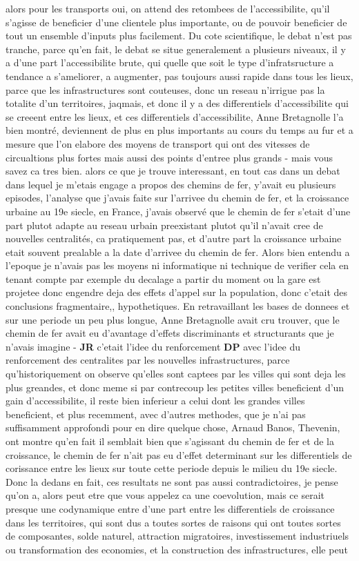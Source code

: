 \documentclass[12pt]{article}
\begin{document}
alors pour les transports oui, on attend des retombees de l'accessibilite, qu'il s'agisse de beneficier d'une clientele plus importante, ou de pouvoir beneficier de tout un ensemble d'inputs plus facilement. Du cote scientifique, le debat n'est pas tranche, parce qu'en fait, le debat se situe generalement a plusieurs niveaux, il y a d'une part l'accessibilite brute, qui quelle que soit le type d'infratsructure a tendance a s'ameliorer, a augmenter, pas toujours aussi rapide dans tous les lieux, parce que les infrastructures sont couteuses, donc un reseau n'irrigue pas la totalite d'un territoires, jaqmais, et donc il y a des differentiels d'accessibilite qui se creeent entre les lieux, et ces differentiels d'accessibilite, Anne Bretagnolle l'a bien montré, deviennent de plus en plus importants au cours du temps au fur et a mesure que l'on elabore des moyens de transport qui ont des vitesses de circualtions plus fortes mais aussi des points d'entree plus grands - mais vous savez ca tres bien. alors ce que je trouve interessant, en tout cas dans un debat dans lequel je m'etais engage a propos des chemins de fer, y'avait eu plusieurs episodes, l'analyse que j'avais faite sur l'arrivee du chemin de fer, et la croissance urbaine au 19e siecle, en France, j'avais observé que le chemin de fer s'etait d'une part plutot adapte au reseau urbain preexistant plutot qu'il n'avait cree de nouvelles centralités, ca pratiquement pas, et d'autre part la croissance urbaine etait souvent prealable a la date d'arrivee du chemin de fer. Alors bien entendu a l'epoque je n'avais pas les moyens ni informatique ni technique de verifier cela en tenant compte par exemple du decalage a partir du moment ou la gare est projetee donc engendre deja des effets d'appel sur la population, donc c'etait des conclusions fragmentaire,, hypothetiques. En retravaillant les bases de donnees et sur une periode un peu plus longue, Anne Bretagnolle avait cru trouver, que le chemin de fer avait eu d'avantage d'effets discriminants et structurants que je n'avais imagine - \textbf{JR} c'etait l'idee du renforcement \textbf{DP} avec l'idee du renforcement des centralites par les nouvelles infrastructures, parce qu'historiquement on observe qu'elles sont captees par les villes qui sont deja les plus greandes, et donc meme si par contrecoup les petites villes beneficient d'un gain d'accessibilite, il reste bien inferieur a celui dont les grandes villes beneficient, et plus recemment, avec d'autres methodes, que je n'ai pas suffisamment approfondi pour en dire quelque chose, Arnaud Banos, Thevenin, ont montre qu'en fait il semblait bien que s'agissant du chemin de fer et de la croissance, le chemin de fer n'ait pas eu d'effet determinant sur les differentiels de corissance entre les lieux sur toute cette periode depuis le milieu du 19e siecle. Donc la dedans en fait, ces resultats ne sont pas aussi contradictoires, je pense qu'on a, alors peut etre que vous appelez ca une coevolution, mais ce serait presque une codynamique entre d'une part entre les differentiels de croissance dans les territoires, qui sont dus a toutes sortes de raisons qui ont toutes sortes de composantes, solde naturel, attraction migratoires, investissement industriuels ou transformation des economies, et la construction des infrastructures, elle peut 
\end{document}
